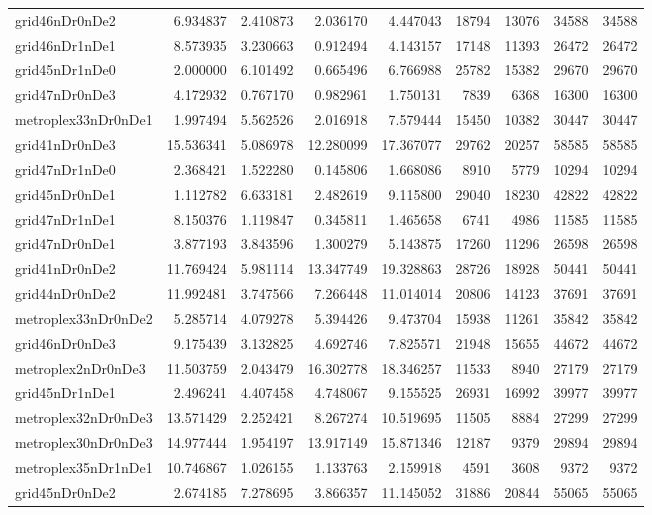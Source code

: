 \begin{longtable}{|l|r|r|r|r|r|r|r|r|}
grid46nDr0nDe2 & 6.934837 & 2.410873 & 2.036170 & 4.447043 & 18794 & 13076 & 34588 & 34588 \\
grid46nDr1nDe1 & 8.573935 & 3.230663 & 0.912494 & 4.143157 & 17148 & 11393 & 26472 & 26472 \\
grid45nDr1nDe0 & 2.000000 & 6.101492 & 0.665496 & 6.766988 & 25782 & 15382 & 29670 & 29670 \\
grid47nDr0nDe3 & 4.172932 & 0.767170 & 0.982961 & 1.750131 & 7839 & 6368 & 16300 & 16300 \\
metroplex33nDr0nDe1 & 1.997494 & 5.562526 & 2.016918 & 7.579444 & 15450 & 10382 & 30447 & 30447 \\
grid41nDr0nDe3 & 15.536341 & 5.086978 & 12.280099 & 17.367077 & 29762 & 20257 & 58585 & 58585 \\
grid47nDr1nDe0 & 2.368421 & 1.522280 & 0.145806 & 1.668086 & 8910 & 5779 & 10294 & 10294 \\
grid45nDr0nDe1 & 1.112782 & 6.633181 & 2.482619 & 9.115800 & 29040 & 18230 & 42822 & 42822 \\
grid47nDr1nDe1 & 8.150376 & 1.119847 & 0.345811 & 1.465658 & 6741 & 4986 & 11585 & 11585 \\
grid47nDr0nDe1 & 3.877193 & 3.843596 & 1.300279 & 5.143875 & 17260 & 11296 & 26598 & 26598 \\
grid41nDr0nDe2 & 11.769424 & 5.981114 & 13.347749 & 19.328863 & 28726 & 18928 & 50441 & 50441 \\
grid44nDr0nDe2 & 11.992481 & 3.747566 & 7.266448 & 11.014014 & 20806 & 14123 & 37691 & 37691 \\
metroplex33nDr0nDe2 & 5.285714 & 4.079278 & 5.394426 & 9.473704 & 15938 & 11261 & 35842 & 35842 \\
grid46nDr0nDe3 & 9.175439 & 3.132825 & 4.692746 & 7.825571 & 21948 & 15655 & 44672 & 44672 \\
metroplex2nDr0nDe3 & 11.503759 & 2.043479 & 16.302778 & 18.346257 & 11533 & 8940 & 27179 & 27179 \\
grid45nDr1nDe1 & 2.496241 & 4.407458 & 4.748067 & 9.155525 & 26931 & 16992 & 39977 & 39977 \\
metroplex32nDr0nDe3 & 13.571429 & 2.252421 & 8.267274 & 10.519695 & 11505 & 8884 & 27299 & 27299 \\
metroplex30nDr0nDe3 & 14.977444 & 1.954197 & 13.917149 & 15.871346 & 12187 & 9379 & 29894 & 29894 \\
metroplex35nDr1nDe1 & 10.746867 & 1.026155 & 1.133763 & 2.159918 & 4591 & 3608 & 9372 & 9372 \\
grid45nDr0nDe2 & 2.674185 & 7.278695 & 3.866357 & 11.145052 & 31886 & 20844 & 55065 & 55065 \\

\end{longtable}
